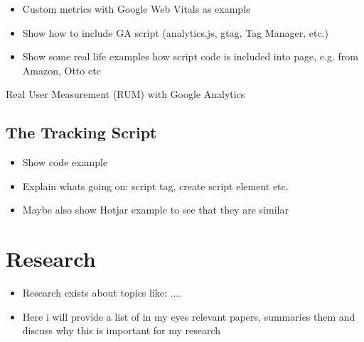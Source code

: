 \begin{itemize}
    \item Custom metrics with Google Web Vitals as example
    \item Show how to include GA script (analytics.js, gtag, Tag Manager, etc.)
    \item Show some real life examples how script code is included into page, e.g. from Amazon, Otto etc
\end{itemize}


Real User Measurement (RUM) with Google Analytics


\subsection{The Tracking Script}

\begin{itemize}
\item Show code example
\item Explain whats going on: script tag, create script element etc.
\item Maybe also show Hotjar example to see that they are similar
\end{itemize}
















\section{Research}


\begin{itemize}
\item Research exists about topics like: ....
\item Here i will provide a list of in my eyes relevant papers, summaries them and discuss why this is important for my research
\end{itemize}



